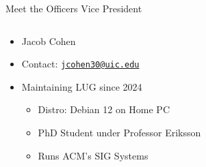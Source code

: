 \documentclass{beamer}
\begin{document}
\begin{frame}{Meet the Officers}
	{\Huge Vice President}
	\begin{columns}
		\begin{column}{0.5\textwidth}
			\begin{itemize}
				\item {\Large Jacob Cohen}
				\item Contact:
					\href{mailto:jcohen30@uic.edu}{\texttt{jcohen30@uic.edu}}
				\item Maintaining LUG since 2024
				\begin{itemize}
					\item Distro: Debian 12 on Home PC
					\item PhD Student under Professor Eriksson
					\item Runs ACM's SIG Systems
				\end{itemize}
			\end{itemize}
		\end{column}
		\begin{column}{0.5\textwidth}
			\begin{figure}
				\centering
			\end{figure}
		\end{column}
	\end{columns}
\end{frame}
\end{document}

